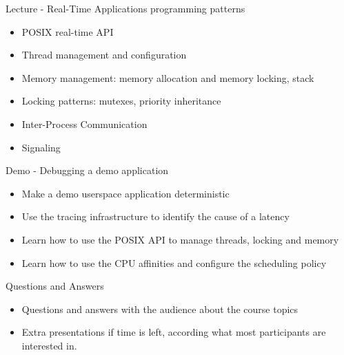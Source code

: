 \documentclass[a4paper,12pt,obeyspaces,spaces,hyphens]{article}
\begin{document}
\feagendatwocolumn
{Lecture - Real-Time Applications programming patterns}
{
  \begin{itemize}
  \item POSIX real-time API
  \item Thread management and configuration
  \item Memory management: memory allocation and memory locking, stack
  \item Locking patterns: mutexes, priority inheritance
  \item Inter-Process Communication
  \item Signaling
  \end{itemize}
}
{Demo - Debugging a demo application}
{
  \begin{itemize}
  \item Make a demo userspace application deterministic
  \item Use the tracing infrastructure to identify the cause of a latency
  \item Learn how to use the POSIX API to manage threads, locking and memory
  \item Learn how to use the CPU affinities and configure the scheduling policy
  \end{itemize}
}

\feagendaonecolumn
{Questions and Answers}
{
  \begin{itemize}
  \item Questions and answers with the audience about the course topics
  \item Extra presentations if time is left, according what most
        participants are interested in.
  \end{itemize}
}
\end{document}
